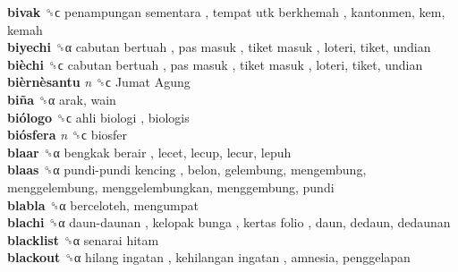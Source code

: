 \textbf{bivak} ␝ϲ   penampungan sementara ,  tempat utk berkhemah , kantonmen, kem, kemah  \\
\textbf{biyechi} ␝α   cabutan bertuah ,  pas masuk ,  tiket masuk , loteri, tiket, undian  \\
\textbf{bièchi} ␝ϲ   cabutan bertuah ,  pas masuk ,  tiket masuk , loteri, tiket, undian  \\
\textbf{bièrnèsantu} \emph{n}  ␝ϲ   Jumat Agung   \\
\textbf{biña} ␝α  arak, wain  \\
\textbf{biólogo} ␝ϲ   ahli biologi , biologis  \\
\textbf{biósfera} \emph{n}  ␝ϲ  biosfer  \\
\textbf{blaar} ␝α   bengkak berair , lecet, lecup, lecur, lepuh  \\
\textbf{blaas} ␝α   pundi-pundi kencing , belon, gelembung, mengembung, menggelembung, menggelembungkan, menggembung, pundi  \\
\textbf{blabla} ␝α  berceloteh, mengumpat  \\
\textbf{blachi} ␝α   daun-daunan ,  kelopak bunga ,  kertas folio , daun, dedaun, dedaunan  \\
\textbf{blacklist} ␝α   senarai hitam   \\
\textbf{blackout} ␝α   hilang ingatan ,  kehilangan ingatan , amnesia, penggelapan  \\
